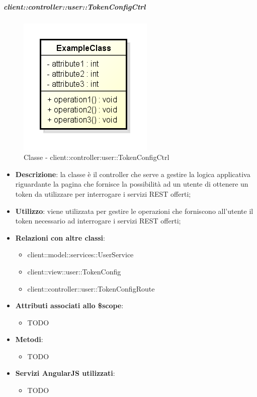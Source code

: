 		\subparagraph{client::controller::user::TokenConfigCtrl} %
		\label{subp:client_controller_user_tokenconfigctrl}
			\begin{figure}[htbp]
				\centering
				\centerline{\includegraphics[scale=0.7]{./images/client/classes/example_class.png}}
				\caption{Classe - client::controller:user::TokenConfigCtrl}
			\end{figure}
			\begin{itemize}
				\item \textbf{Descrizione}: la classe è il controller che serve a gestire la logica applicativa riguardante la pagina che fornisce la possibilità ad un utente di ottenere un token da utilizzare per interrogare i servizi REST offerti;
				\item \textbf{Utilizzo}: viene utilizzata per gestire le operazioni che forniscono all'utente il token necessario ad interrogare i servizi REST offerti;
				\item \textbf{Relazioni con altre classi}:
					\begin{itemize}
						\item client::model::services::UserService
						\item client::view::user::TokenConfig
						\item client::controller::user::TokenConfigRoute
					\end{itemize}

				\item \textbf{Attributi associati allo \$scope}:
					\begin{itemize}
						\item TODO
					\end{itemize}

				\item \textbf{Metodi}:
					\begin{itemize}
						\item TODO
					\end{itemize}

				\item \textbf{Servizi AngularJS utilizzati}:
					\begin{itemize}
						\item TODO
					\end{itemize}

			\end{itemize}


